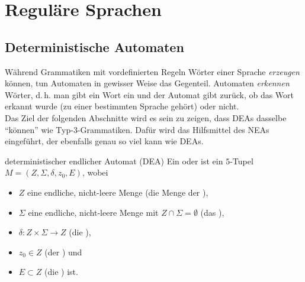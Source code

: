 \section{%
    Reguläre Sprachen%
}

\subsection{%
    Deterministische Automaten%
}

\begin{Bem}
    Während Grammatiken mit vordefinierten Regeln Wörter einer Sprache
    \emph{erzeugen} können, tun Automaten in gewisser Weise das Gegenteil.
    Automaten \emph{erkennen} Wörter, d.\,h. man gibt ein Wort ein und der
    Automat gibt zurück, ob das Wort erkannt wurde
    (zu einer bestimmten Sprache gehört) oder nicht.\\
    Das Ziel der folgenden Abschnitte wird es sein zu zeigen, dass
    DEAs dasselbe "`können"' wie Typ-3-Grammatiken.
    Dafür wird das Hilfsmittel des NEAs eingeführt, der ebenfalls genau so viel
    kann wie DEAs.
\end{Bem}

\linie

\begin{Def}{deterministischer endlicher Automat (DEA)}
    Ein 
    oder  ist ein $5$-Tupel $M = (Z, \Sigma, \delta, z_0, E)$,
    wobei
    \begin{itemize}
        \item
        $Z$ eine endliche, nicht-leere Menge
        (die Menge der ),
        
        \item
        $\Sigma$ eine endliche, nicht-leere Menge
        mit $Z \cap \Sigma = \emptyset$
        (das ),
        
        \item
        $\delta\colon Z \times \Sigma \rightarrow Z$
        (die ),
        
        \item
        $z_0 \in Z$ (der ) und
        
        \item
        $E \subset Z$ (die ) ist.
    \end{itemize}
\end{Def}

